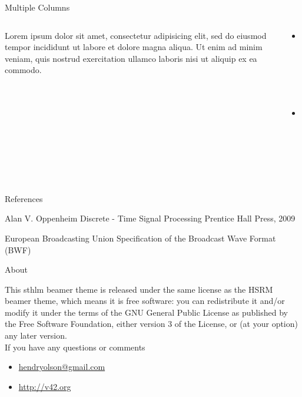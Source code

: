 \documentclass[newPxFont]{beamer}
\begin{document}

\begin{frame}{Multiple Columns}
\begin{columns}
\begin{column}{.48\linewidth}
        Lorem ipsum dolor sit amet, consectetur adipisicing elit, sed do eiusmod
        tempor incididunt ut labore et dolore magna aliqua. Ut enim ad minim veniam,
        quis nostrud exercitation ullamco laboris nisi ut aliquip ex ea commodo.
\end{column}
\begin{column}{.48\linewidth}
        \begin{itemize}
            \item Point 1
            \item Point 2
        \end{itemize}
    \end{column}
    \end{columns}
\end{frame}

\begin{frame}{References}
    \begin{thebibliography}{10}

    \beamertemplatebookbibitems
    Alan V. Oppenheim
    \newblock Discrete - Time Signal Processing
    \newblock Prentice Hall Press, 2009

    \beamertemplatearticlebibitems
    European Broadcasting Union
    \newblock Specification of the Broadcast Wave Format (BWF)

  \end{thebibliography}
\end{frame}

%
%

\begin{frame}{About}

This sthlm beamer theme is released under the same license as the HSRM beamer theme, which means it is free software: you can redistribute it and/or modify
it under the terms of the GNU General Public License as published by
the Free Software Foundation, either version 3 of the License, or
(at your option) any later version.\\

If you have any questions or comments
\begin{itemize}
    \item \url{hendryolson@gmail.com}
    \item \url{http://v42.org}
\end{itemize}
\end{frame}
\end{document}
